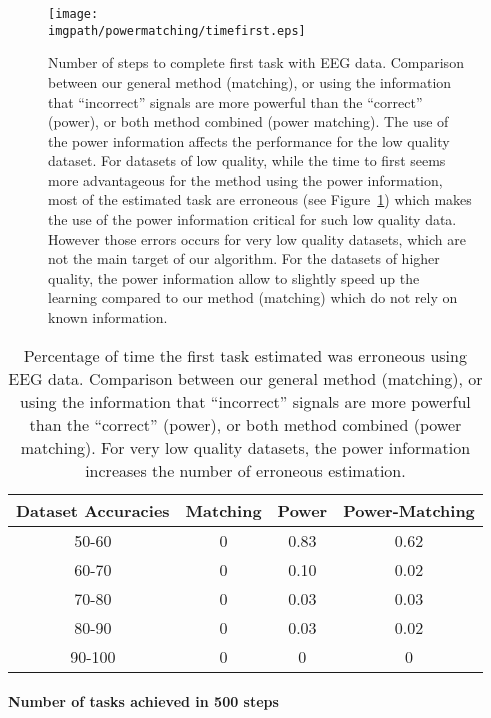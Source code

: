 \begin{figure}[!ht]
\centering
\texttt{[image: \\imgpath/powermatching/timefirst.eps]}
\caption{Number of steps to complete first task with EEG data. Comparison between our general method (matching), or using the information that ``incorrect'' signals are more powerful than the ``correct'' (power), or both method combined (power matching). The use of the power information affects the performance for the low quality dataset. For datasets of low quality, while the time to first seems more advantageous for the method using the power information, most of the estimated task are erroneous (see Figure~\ref{tab:errorTaskRatio}) which makes the use of the power information critical for such low quality data. However those errors occurs for very low quality datasets, which are not the main target of our algorithm. For the datasets of higher quality, the power information allow to slightly speed up the learning compared to our method (matching) which do not rely on known information.}
\label{fig:timefirst_powermatching}
\end{figure} 

\begin{table}
\centering
{}
\begin{tabular}{c c c c}
    Dataset Accuracies & Matching & Power & Power-Matching \\ \hline
    50-60 & 0 & 0.83 & 0.62 \\ 
    60-70 & 0 & 0.10 & 0.02 \\
    70-80 & 0 & 0.03 & 0.03 \\
    80-90 & 0 & 0.03 & 0.02 \\
    90-100 & 0 & 0 & 0 \\
\end{tabular}
\caption{Percentage of time the first task estimated was erroneous using EEG data. Comparison between our general method (matching), or using the information that ``incorrect'' signals are more powerful than the ``correct'' (power), or both method combined (power matching). For very low quality datasets, the power information increases the number of erroneous estimation.}
\label{tab:errorTaskRatio}
\end{table}


\paragraph{Number of tasks achieved in 500 steps}

